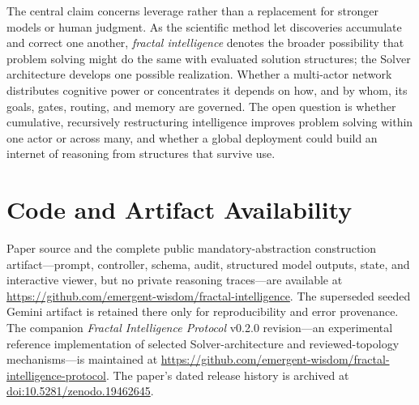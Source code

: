 \documentclass[11pt]{article}
\begin{document}
The central claim concerns leverage rather than a replacement for stronger models or human judgment. As the scientific method let discoveries accumulate and correct one another, \emph{fractal intelligence} denotes the broader possibility that problem solving might do the same with evaluated solution structures; the Solver architecture develops one possible realization. Whether a multi-actor network distributes cognitive power or concentrates it depends on how, and by whom, its goals, gates, routing, and memory are governed. The open question is whether cumulative, recursively restructuring intelligence improves problem solving within one actor or across many, and whether a global deployment could build an internet of reasoning from structures that survive use.

\section*{Code and Artifact Availability}

Paper source and the complete public mandatory-abstraction construction artifact---prompt, controller, schema, audit, structured model outputs, state, and interactive viewer, but no private reasoning traces---are available at \url{https://github.com/emergent-wisdom/fractal-intelligence}. The superseded seeded Gemini artifact is retained there only for reproducibility and error provenance. The companion \emph{Fractal Intelligence Protocol} v0.2.0 revision---an experimental reference implementation of selected Solver-architecture and reviewed-topology mechanisms---is maintained at \url{https://github.com/emergent-wisdom/fractal-intelligence-protocol}. The paper's dated release history is archived at \href{https://doi.org/10.5281/zenodo.19462645}{doi:10.5281/zenodo.19462645}.



\end{document}

